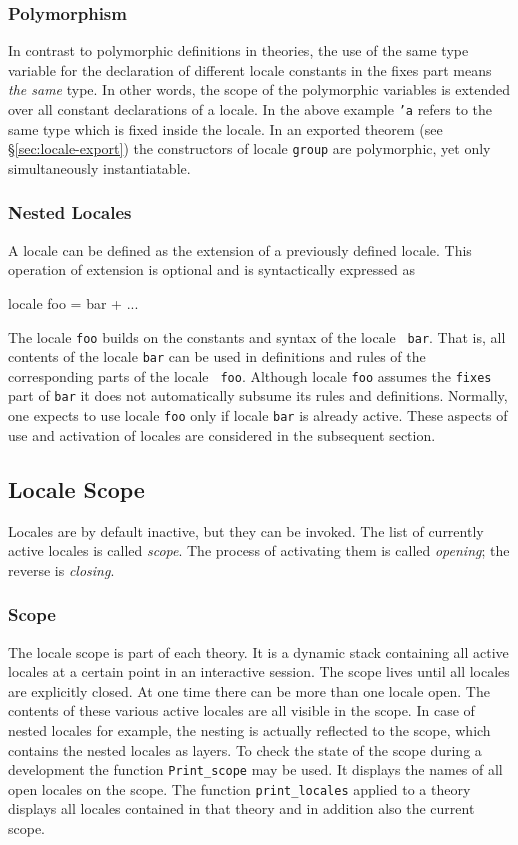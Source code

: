 \subsubsection{Polymorphism}

In contrast to polymorphic definitions in theories, the use of the
same type variable for the declaration of different locale constants in the
fixes part means \emph{the same} type.  In other words, the scope of the
polymorphic variables is extended over all constant declarations of a locale.
In the above example \texttt{'a} refers to the same type which is fixed inside
the locale.  In an exported theorem (see \S\ref{sec:locale-export}) the
constructors of locale \texttt{group} are polymorphic, yet only simultaneously
instantiatable.

\subsubsection{Nested Locales}

A locale can be defined as the extension of a previously defined
locale.  This operation of extension is optional and is syntactically
expressed as 
\begin{ttbox}
locale foo = bar + ...
\end{ttbox}
The locale \texttt{foo} builds on the constants and syntax of the locale {\tt
bar}.  That is, all contents of the locale \texttt{bar} can be used in
definitions and rules of the corresponding parts of the locale {\tt
foo}.  Although locale \texttt{foo} assumes the \texttt{fixes} part of \texttt{bar} it
does not automatically subsume its rules and definitions.  Normally, one
expects to use locale \texttt{foo} only if locale \texttt{bar} is already
active.  These aspects of use and activation of locales are considered in the
subsequent section.


\subsection{Locale Scope}

Locales are by default inactive, but they can be invoked.  The list of
currently active locales is called \emph{scope}.  The process of activating
them is called \emph{opening}; the reverse is \emph{closing}.

\subsubsection{Scope}
The locale scope is part of each theory.  It is a dynamic stack containing
all active locales at a certain point in an interactive session.
The scope lives until all locales are explicitly closed.  At one time there
can be more than one locale open.  The contents of these various active
locales are all visible in the scope.  In case of nested locales for example,
the nesting is actually reflected to the scope, which contains the nested
locales as layers.  To check the state of the scope during a development the
function \texttt{Print\_scope} may be used.  It displays the names of all open
locales on the scope.  The function \texttt{print\_locales} applied to a theory
displays all locales contained in that theory and in addition also the
current scope.

